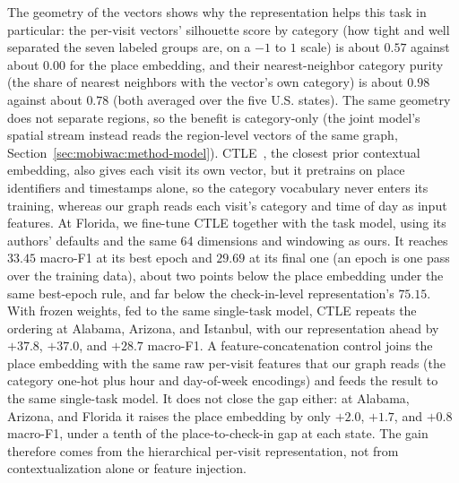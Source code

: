 The geometry of the vectors shows why the representation helps this task in
particular: the per-visit vectors' silhouette score by category (how tight and well separated the seven labeled groups are, on a $-1$ to $1$ scale) is about $0.57$ against about $0.00$ for the place embedding, and their nearest-neighbor category purity (the share of nearest neighbors with the vector's own category) is about $0.98$ against about $0.78$ (both averaged over the five U.S. states). The same geometry does not separate regions, so the benefit is category-only (the joint model's spatial stream instead reads the region-level vectors of the same graph, Section~\ref{sec:mobiwac:method-model}). CTLE~\cite{lin2021ctle}, the closest prior contextual embedding, also gives each visit its own vector, but it pretrains on place identifiers and timestamps alone, so the category vocabulary never enters its training, whereas our graph reads each visit's category and time of day as input features. At Florida, we fine-tune CTLE together with the task model, using its authors' defaults and the same 64 dimensions and windowing as ours. It reaches $33.45$ macro-F1 at its best epoch and $29.69$ at its final one (an epoch is one pass over the training data), about two points below the place embedding under the same best-epoch rule, and far below the check-in-level representation's $75.15$. With frozen weights, fed to the same single-task model, CTLE repeats the ordering at Alabama, Arizona, and Istanbul, with our representation ahead by $+37.8$, $+37.0$, and $+28.7$ macro-F1. A feature-concatenation control joins the place embedding with the same raw
per-visit features that our graph reads (the category one-hot plus hour and
day-of-week encodings) and feeds the result to the same single-task model. It
does not close the gap either: at Alabama, Arizona, and Florida it raises the
place embedding by only $+2.0$, $+1.7$, and $+0.8$ macro-F1, under a tenth of
the place-to-check-in gap at each state. The gain therefore comes from
the hierarchical per-visit representation, not from contextualization alone or
feature injection.

\providecommand{\sd}[1]{\,{\scriptsize$\pm$#1}}



